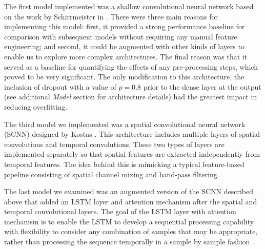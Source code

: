 \documentclass[10pt,twocolumn,letterpaper]{article}
\begin{document}
The first model implemented was a shallow convolutional neural network
based on the work by Schirrmeister \etal in \cite{DBLP}. There were three main
reasons for implementing this model: first, it provided a strong performance
baseline for comparison with subsequent models without requiring any manual
feature engineering; and second, it could be augmented with other kinds of
layers to enable us to explore more complex architectures. The final reason was that it served as a baseline for quantifying the effects of any pre-processing steps, which proved to be very significant. The only modification to this architecture, the inclusion of dropout with a value of $p=0.8$ prior to the dense
layer at the output (see additional \emph{Model} section for architecture
details) had the greatest impact in reducing overfitting.


The third model we implemented was a spatial convolutional neural network
(SCNN) designed by Kostas \etal \cite{kostas2019machine}. This architecture
includes multiple layers of spatial convolutions and temporal convolutions.
These two types of layers are implemented separately so that spatial features
are extracted independently from temporal features. The idea behind this is
mimicking a typical feature-based pipeline consisting of spatial channel mixing
and band-pass filtering.

The last model we examined was an augmented version of the SCNN described above
that added an LSTM layer and attention mechanism after the spatial and temporal
convolutional layers. The goal of the LSTM layer with attention mechanism is to
enable the LSTM to develop a sequential processing capability with flexibility
to consider any combination of samples that may be appropriate, rather than
processing the sequence temporally in a sample by sample fashion
\cite{kostas2019machine}.
\end{document}
